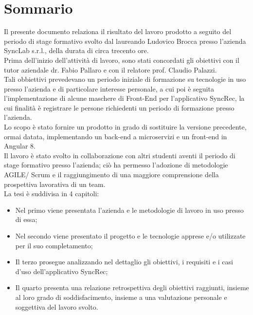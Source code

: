 
\cleardoublepage
{}
{}
\begingroup
\let\clearpage\relax
\let\cleardoublepage\relax
\let\cleardoublepage\relax

\chapter*{Sommario}

Il presente documento relaziona il risultato del lavoro prodotto a seguito del periodo di stage formativo svolto dal laureando Ludovico Brocca presso l'azienda SyncLab s.r.l., della durata di circa trecento ore.\\
Prima dell'inizio dell'attività di lavoro, sono stati concordati gli obiettivi con il tutor aziendale dr. Fabio Pallaro e con il relatore prof. Claudio Palazzi.\\
Tali obbiettivi prevedevano un periodo iniziale di formazione su tecnologie in uso presso l'azienda e di particolare interesse personale, a cui poi è seguita l'implementazione di alcune maschere di Front-End per l'applicativo SyncRec, la cui finalità è registrare le persone richiedenti un periodo di formazione presso l'azienda.\\
Lo scopo è stato fornire un prodotto in grado di sostituire la versione precedente, ormai datata, implementando un back-end a microservizi e un front-end in Angular 8.\\
Il lavoro è stato svolto in collaborazione con altri studenti aventi il periodo di stage formativo presso l'azienda; ciò ha permesso l'adozione di metodologie AGILE/ Scrum e il raggiungimento di una maggiore comprensione della prospettiva lavorativa di un team.\\
La tesi è suddivisa in 4 capitoli:
\begin{itemize}
	\item Nel primo viene presentata l'azienda e le metodologie di lavoro in uso presso di essa;
	\item Nel secondo viene presentato il progetto e le tecnologie apprese e/o utilizzate per il suo completamento;
	\item Il terzo prosegue analizzando nel dettaglio gli obiettivi, i requisiti e i casi d'uso dell'applicativo SyncRec; 
	\item Il quarto presenta una relazione retrospettiva degli obiettivi raggiunti, insieme al loro grado di soddisfacimento, insieme a una valutazione personale e soggettiva del lavoro svolto.
\end{itemize}
